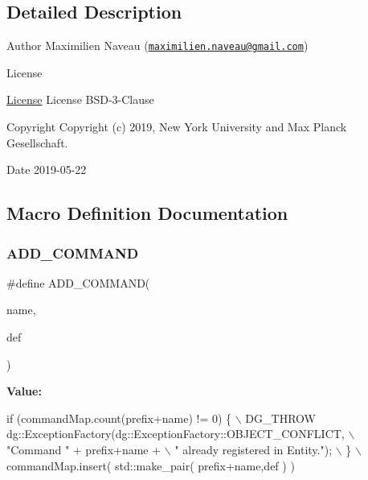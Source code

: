 \subsection{Detailed Description}
\begin{DoxyAuthor}{Author}
Maximilien Naveau (\href{mailto:maximilien.naveau@gmail.com}{\tt maximilien.\+naveau@gmail.\+com}) 
\end{DoxyAuthor}
\begin{DoxyRefDesc}{License}
\item[\hyperlink{license__license000052}{License}]License B\+S\+D-\/3-\/\+Clause \end{DoxyRefDesc}
\begin{DoxyCopyright}{Copyright}
Copyright (c) 2019, New York University and Max Planck Gesellschaft. 
\end{DoxyCopyright}
\begin{DoxyDate}{Date}
2019-\/05-\/22 
\end{DoxyDate}


\subsection{Macro Definition Documentation}
\mbox{\label{periodic-call_8cpp_a9e89a4fffa38d0e165c3e64293abe763}} 
\subsubsection{\texorpdfstring{A\+D\+D\+\_\+\+C\+O\+M\+M\+A\+ND}{ADD\_COMMAND}}
{\footnotesize\ttfamily \#define A\+D\+D\+\_\+\+C\+O\+M\+M\+A\+ND(\begin{DoxyParamCaption}\item[{}]{name,  }\item[{}]{def }\end{DoxyParamCaption})}

{\bfseries Value\+:}
\begin{DoxyCode}
\textcolor{keywordflow}{if} (commandMap.count(prefix+name) != 0) \{                            \(\backslash\)
  DG\_THROW dg::ExceptionFactory(dg::ExceptionFactory::OBJECT\_CONFLICT,        \(\backslash\)
  \textcolor{stringliteral}{"Command "} + prefix+name +                   \(\backslash\)
  \textcolor{stringliteral}{" already registered in Entity."});          \(\backslash\)
  \}                                                                       \(\backslash\)
  commandMap.insert( std::make\_pair( prefix+name,def ) )
\end{DoxyCode}
